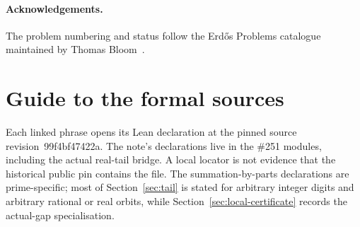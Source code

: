 \documentclass[11pt]{article}
\renewcommand{\commitshort}{99f4bf47422a}
\begin{document}
\paragraph{Acknowledgements.} The problem numbering and status follow the
Erd\H{o}s Problems catalogue maintained by Thomas Bloom~\cite{erdosproblems}.

\appendix
\section{Guide to the formal sources}\label{app:index}

Each linked phrase opens its Lean declaration at the pinned source
revision~\commitshort.  The note's declarations live in the \#251 modules,
including the actual real-tail bridge.  A local locator is not evidence that
the historical public pin contains the file.  The summation-by-parts
declarations are prime-specific; most of Section~\ref{sec:tail} is stated for
arbitrary integer digits and arbitrary rational or real orbits, while
Section~\ref{sec:local-certificate} records the actual-gap specialisation.

\iffalse
\end{document}
